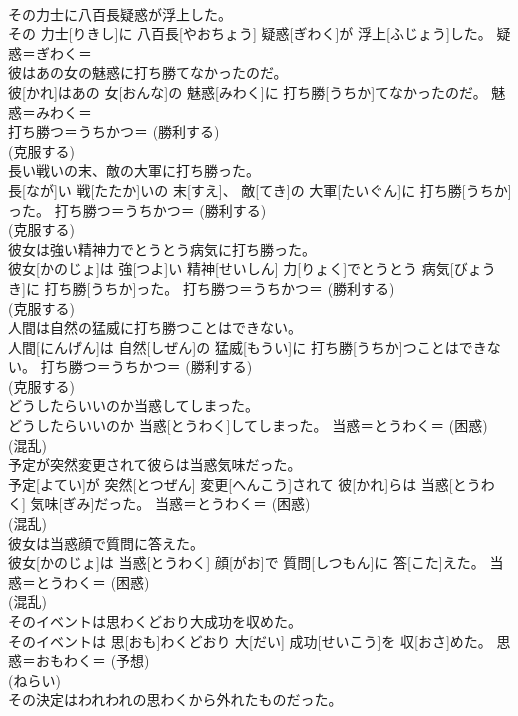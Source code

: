 \documentclass[8pt]{extreport}
\begin{document}
\begin{CJK}{UTF8}{min}
{\\	その力士に八百長疑惑が浮上した。	
\\	その 力士[りきし]に 八百長[やおちょう] 疑惑[ぎわく]が 浮上[ふじょう]した。	疑惑＝ぎわく＝ 
\\	彼はあの女の魅惑に打ち勝てなかったのだ。	
\\	彼[かれ]はあの 女[おんな]の 魅惑[みわく]に 打ち勝[うちか]てなかったのだ。	魅惑＝みわく＝ 
\\	打ち勝つ＝うちかつ＝ (勝利する) 
\\	(克服する) 
\\	長い戦いの末、敵の大軍に打ち勝った。	
\\	長[なが]い 戦[たたか]いの 末[すえ]、 敵[てき]の 大軍[たいぐん]に 打ち勝[うちか]った。	打ち勝つ＝うちかつ＝ (勝利する) 
\\	(克服する) 
\\	彼女は強い精神力でとうとう病気に打ち勝った。	
\\	彼女[かのじょ]は 強[つよ]い 精神[せいしん] 力[りょく]でとうとう 病気[びょうき]に 打ち勝[うちか]った。	打ち勝つ＝うちかつ＝ (勝利する) 
\\	(克服する) 
\\	人間は自然の猛威に打ち勝つことはできない。	
\\	人間[にんげん]は 自然[しぜん]の 猛威[もうい]に 打ち勝[うちか]つことはできない。	打ち勝つ＝うちかつ＝ (勝利する) 
\\	(克服する) 
\\	どうしたらいいのか当惑してしまった。	
\\	どうしたらいいのか 当惑[とうわく]してしまった。	当惑＝とうわく＝ (困惑) 
\\	(混乱) 
\\	予定が突然変更されて彼らは当惑気味だった。	
\\	予定[よてい]が 突然[とつぜん] 変更[へんこう]されて 彼[かれ]らは 当惑[とうわく] 気味[ぎみ]だった。	当惑＝とうわく＝ (困惑) 
\\	(混乱) 
\\	彼女は当惑顔で質問に答えた。	
\\	彼女[かのじょ]は 当惑[とうわく] 顔[がお]で 質問[しつもん]に 答[こた]えた。	当惑＝とうわく＝ (困惑) 
\\	(混乱) 
\\	そのイベントは思わくどおり大成功を収めた。	
\\	そのイベントは 思[おも]わくどおり 大[だい] 成功[せいこう]を 収[おさ]めた。	思惑＝おもわく＝ (予想) 
\\	(ねらい) 
\\	その決定はわれわれの思わくから外れたものだった。	
}
\end{CJK}
\end{document}
